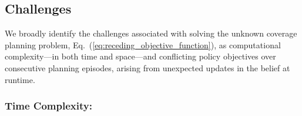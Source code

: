 \documentclass[letterpaper]{article} %
\begin{document}
\subsection{Challenges} \label{ssec:challenges}

    


 
   
We broadly identify the challenges associated with solving the unknown coverage planning problem, Eq.~(\ref{eq:receding_objective_function}), as computational complexity---in both time and space---and conflicting policy objectives over consecutive planning episodes, arising from unexpected updates in the belief at runtime.


\subsubsection{Time Complexity:} \hfill
\vspace{-0.25pt}
\end{document}
